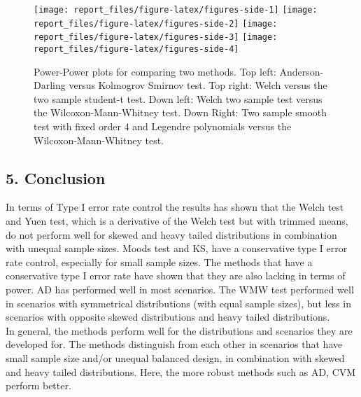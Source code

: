 \documentclass[
]{article}
\begin{document}
\begin{figure}[H]
\texttt{[image: report\_files/figure-latex/figures-side-1]} \texttt{[image: report\_files/figure-latex/figures-side-2]} \texttt{[image: report\_files/figure-latex/figures-side-3]} \texttt{[image: report\_files/figure-latex/figures-side-4]} \caption{Power-Power plots for comparing two methods. Top left: Anderson-Darling versus Kolmogrov Smirnov test. Top right: Welch versus the two sample student-t test. Down left: Welch two sample test versus the Wilcoxon-Mann-Whitney test. Down Right: Two sample smooth test with fixed order 4 and Legendre polynomials versus the Wilcoxon-Mann-Whitney test.}\label{fig:figures-side}
\end{figure}

\hypertarget{conclusion}{%
\subsection{5. Conclusion}\label{conclusion}}

In terms of Type I error rate control the results has shown that the
Welch test and Yuen test, which is a derivative of the Welch test but
with trimmed means, do not perform well for skewed and heavy tailed
distributions in combination with unequal sample sizes. Moods test and
KS, have a conservative type I error rate control, especially for small
sample sizes. The methods that have a conservative type I error rate
have shown that they are also lacking in terms of power. AD has
performed well in most scenarios. The WMW test performed well in
scenarios with symmetrical distributions (with equal sample sizes), but
less in scenarios with opposite skewed distributions and heavy tailed
distributions.\\
In general, the methods perform well for the distributions and scenarios
they are developed for. The methods distinguish from each other in
scenarios that have small sample size and/or unequal balanced design, in
combination with skewed and heavy tailed distributions. Here, the more
robust methods such as AD, CVM perform better.
\end{document}
